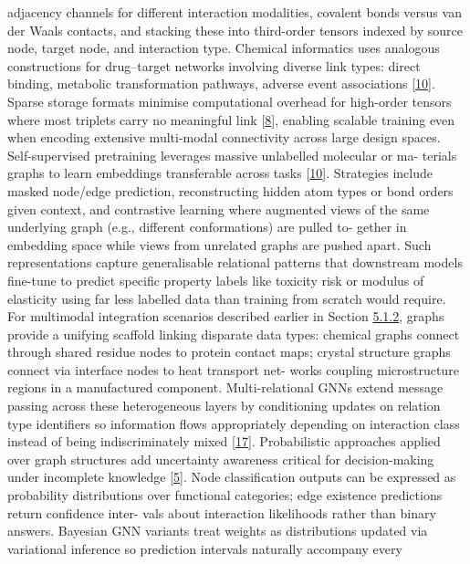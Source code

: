 \documentclass[
]{article}
\begin{document}
adjacency channels for different interaction modalities, covalent bonds
versus van der Waals contacts, and stacking these into third-order
tensors indexed by source node, target node, and interaction type.
Chemical informatics uses analogous constructions for drug--target
networks involving diverse link types: direct binding, metabolic
transformation pathways, adverse event associations
{[}\hyperref[_bookmark50]{10}{]}. Sparse storage formats minimise
computational overhead for high-order tensors where most triplets carry
no meaningful link {[}\hyperref[_bookmark48]{8}{]}, enabling scalable
training even when encoding extensive multi-modal connectivity across
large design spaces. Self-supervised pretraining leverages massive
unlabelled molecular or ma- terials graphs to learn embeddings
transferable across tasks {[}\hyperref[_bookmark50]{10}{]}. Strategies
include masked node/edge prediction, reconstructing hidden atom types or
bond orders given context, and contrastive learning where augmented
views of the same underlying graph (e.g., different conformations) are
pulled to- gether in embedding space while views from unrelated graphs
are pushed apart. Such representations capture generalisable relational
patterns that downstream models fine-tune to predict specific property
labels like toxicity risk or modulus of elasticity using far less
labelled data than training from scratch would require. For multimodal
integration scenarios described earlier in Section
\hyperref[spatial-complementarity-and-interaction-modelling]{5.1.2},
graphs provide a unifying scaffold linking disparate data types:
chemical graphs connect through shared residue nodes to protein contact
maps; crystal structure graphs connect via interface nodes to heat
transport net- works coupling microstructure regions in a manufactured
component. Multi-relational GNNs extend message passing across these
heterogeneous layers by conditioning updates on relation type
identifiers so information flows appropriately depending on interaction
class instead of being indiscriminately mixed
{[}\hyperref[_bookmark57]{17}{]}. Probabilistic approaches applied over
graph structures add uncertainty awareness critical for decision-making
under incomplete knowledge {[}\hyperref[_bookmark45]{5}{]}. Node
classification outputs can be expressed as probability distributions
over functional categories; edge existence predictions return confidence
inter- vals about interaction likelihoods rather than binary answers.
Bayesian GNN variants treat weights as distributions updated via
variational inference so prediction intervals naturally accompany every
\end{document}

